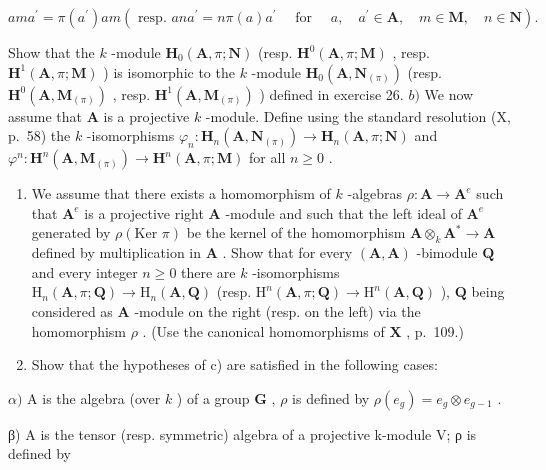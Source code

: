 \[
a m a ^ {\prime} = \pi (a ^ {\prime}) a m (\text { resp. } a n a ^ {\prime} = n \pi (a) a ^ {\prime} \quad \text { for } \quad a, \quad a ^ {\prime} \in \mathbf {A}, \quad m \in \mathbf {M}, \quad n \in \mathbf {N}).
\]

Show that the \(k\) -module \(\mathbf{H}_0(\mathbf{A}, \pi; \mathbf{N})\) (resp. \(\mathbf{H}^0(\mathbf{A}, \pi; \mathbf{M})\) , resp. \(\mathbf{H}^1(\mathbf{A}, \pi; \mathbf{M})\) ) is isomorphic to the \(k\) -module \(\mathbf{H}_0(\mathbf{A}, \mathbf{N}_{(\pi)})\) (resp. \(\mathbf{H}^0(\mathbf{A}, \mathbf{M}_{(\pi)})\) , resp. \(\mathbf{H}^1(\mathbf{A}, \mathbf{M}_{(\pi)})\) ) defined in exercise 26. \(b)\) We now assume that \(\mathbf{A}\) is a projective \(k\) -module. Define using the standard resolution (X, p.~58) the \(k\) -isomorphisms \(\varphi_n: \mathbf{H}_n(\mathbf{A}, \mathbf{N}_{(\pi)}) \to \mathbf{H}_n(\mathbf{A}, \pi; \mathbf{N})\) and \(\varphi^n: \mathbf{H}^n(\mathbf{A}, \mathbf{M}_{(\pi)}) \to \mathbf{H}^n(\mathbf{A}, \pi; \mathbf{M})\) for all \(n \geqslant 0\) .

\begin{enumerate}
\def\labelenumi{\alph{enumi})}
\setcounter{enumi}{2}
\item
  We assume that there exists a homomorphism of \(k\) -algebras \(\rho: \mathbf{A} \to \mathbf{A}^e\) such that \(\mathbf{A}^e\) is a projective right \(\mathbf{A}\) -module and such that the left ideal of \(\mathbf{A}^e\) generated by \(\rho(\text{Ker } \pi)\) be the kernel of the homomorphism \(\mathbf{A} \otimes_k \mathbf{A}^* \to \mathbf{A}\) defined by multiplication in \(\mathbf{A}\) . Show that for every \((\mathbf{A}, \mathbf{A})\) -bimodule \(\mathbf{Q}\) and every integer \(n \geqslant 0\) there are \(k\) -isomorphisms \(\mathrm{H}_n(\mathbf{A}, \pi; \mathbf{Q}) \to \mathrm{H}_n(\mathbf{A}, \mathbf{Q})\) (resp. \(\mathrm{H}^n(\mathbf{A}, \pi; \mathbf{Q}) \to \mathrm{H}^n(\mathbf{A}, \mathbf{Q})\) ), \(\mathbf{Q}\) being considered as \(\mathbf{A}\) -module on the right (resp. on the left) via the homomorphism \(\rho\) . (Use the canonical homomorphisms of \(\mathbf{X}\) , p.~109.)
\item
  Show that the hypotheses of c) are satisfied in the following cases:
\end{enumerate}

\(\alpha)\) A is the algebra (over \(k\) ) of a group \(\mathbf{G}\) , \(\rho\) is defined by \(\rho(e_g) = e_g \otimes e_{g-1}\) .

β) A is the tensor (resp. symmetric) algebra of a projective k-module V; ρ is defined by

